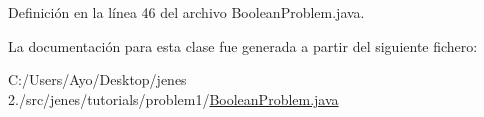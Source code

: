 Definición en la línea 46 del archivo Boolean\-Problem.\-java.



La documentación para esta clase fue generada a partir del siguiente fichero\-:\begin{DoxyCompactItemize}
\item 
C\-:/\-Users/\-Ayo/\-Desktop/jenes 2./src/jenes/tutorials/problem1/\hyperlink{problem1_2_boolean_problem_8java}{Boolean\-Problem.\-java}\end{DoxyCompactItemize}
